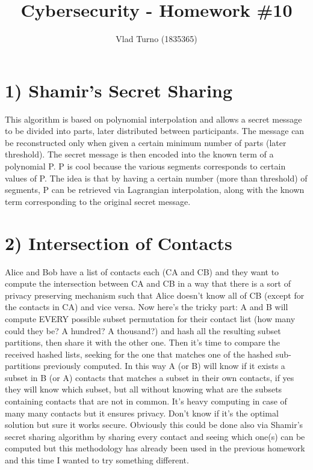 \documentclass{article}
\title{Cybersecurity - Homework \#10}
\author{Vlad Turno (1835365)}
\begin{document}
\maketitle

\section*{1) Shamir's Secret Sharing}
This algorithm is based on polynomial interpolation and allows a secret message to be divided into parts, later distributed between participants. The message can be reconstructed only when given a certain minimum number of parts (later threshold).
The secret message is then encoded into the known term of a polynomial P. P is cool because the various segments corresponds to certain values of P. The idea is that by having a certain number (more than threshold) of segments, P can be retrieved via Lagrangian interpolation, along with the known term corresponding to the original secret message. 

\section*{2) Intersection of Contacts}
Alice and Bob have a list of contacts each (CA and CB) and they want to compute the intersection between CA and CB in a way that there is a sort of privacy preserving mechanism such that Alice doesn't know all of CB (except for the contacts in CA) and vice versa. 
Now here's the tricky part: A and B will compute EVERY possible subset permutation for their contact list (how many could they be? A hundred? A thousand?) and hash all the resulting subset partitions, then share it with the other one. Then it's time to compare the received hashed lists, seeking for the one that matches one of the hashed sub-partitions previously computed.
In this way A (or B) will know if it exists a subset in B (or A) contacts that matches a subset in their own contacts, if yes they will know which subset, but all without knowing what are the subsets containing contacts that are not in common. 
It's heavy computing in case of many many contacts but it ensures privacy. Don't know if it's the optimal solution but sure it works secure. Obviously this could be done also via Shamir's secret sharing algorithm by sharing every contact and seeing which one(s) can be computed but this methodology has already been used in the previous homework and this time I wanted to try something different. 
\end{document}
